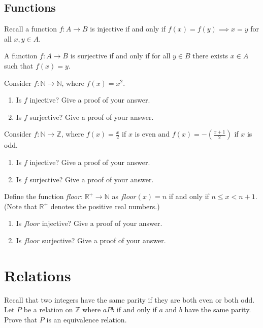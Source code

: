 \documentclass[]{exam}
\theoremstyle{definition}
\newcommand{\bb}[1]{\mathbb{#1}}
\newcommand{\Z}{\bb{Z}}
\newcommand{\R}{\bb{R}}
\newcommand{\N}{\bb{N}}
\begin{document}
\begin{questions}
\subsection*{Functions}
Recall a function $f: A \to B$ is injective if and only if $f(x) = f(y) \implies
x = y$ for all $x,y \in A$.

A function $f: A \to B$ is surjective if and only if for all $y \in B$ there
exists $x \in A$ such that $f(x) = y$. 

\question Consider $f: \N \to \N$, where $f(x) = x^2$.

\begin{enumerate}[label=\alph*)]
\item Is $f$ injective? Give a proof of your answer.

\item Is $f$ surjective? Give a proof of your answer.
\end{enumerate}


\question Consider $f: \N \to \Z$, where $f(x) = \frac{x}{2}$ if $x$ is even
and $f(x) = -\left (\frac{x+1}{2} \right) $ if $x$ is odd.
\begin{enumerate}[label=\alph*)]
\item Is $f$ injective? Give a proof of your answer.
\item Is $f$ surjective? Give a proof of your answer.
\end{enumerate}

\question
Define the function \emph{floor}: $\R^+ \to \N$ as $floor(x) = n$ if and only if
$n \leq x < n+1$.(Note that $\R^+$ denotes the positive real numbers.)

\begin{enumerate}[label=\alph*)]
\item Is $floor$ injective? Give a proof of your answer. 

\item Is $floor$ surjective? Give a proof of your answer.

\end{enumerate}

\section*{Relations}

\question Recall that two integers have the same parity if they are both
          even or both odd. Let $P$ be a relation on $\Z$ where $aPb$
          if and only if $a$ and $b$ have the same parity. Prove that
          $P$ is an equivalence relation.



\end{questions}
\end{document}
